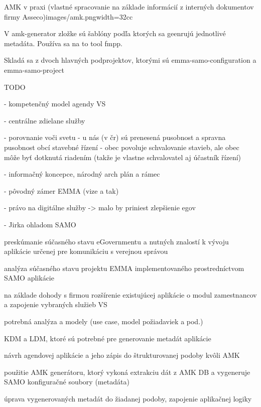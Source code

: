{AMK v praxi (vlastné spracovanie na základe informácií z interných dokumentov firmy Asseco)}{images/amk.png}{width=32cc}

V amk-generator zložke sú šablóny podľa ktorých sa geenrujú jednotlivé metadáta. Používa sa na to tool fmpp.

Skladá sa z dvoch hlavných podprojektov, ktorými sú emma-samo-configuration a emma-samo-project


\TODO
TODO

- kompetenčný model agendy VS

- centrálne zdielane služby

- porovnanie voči svetu - u nás (v čr) sú prenesená pusobnost a spravna pusobnost obcí
stavebné řízení - obec povoluje schvalovanie stavieb, ale obec môže byť dotknutá riadením (takže je vlastne schvalovatel aj účastník řízení)

- informačný koncepce, národný arch plán a rámec

- pôvodný zámer EMMA (vize a tak)

- právo na digitálne služby -> malo by priniest zlepšienie egov

- Jirka ohladom SAMO


\startitemize[n]
\item{preskúmanie súčasného stavu eGovernmentu a nutných znalostí k vývoju aplikácie určenej pre komunikáciu s verejnou správou}
\item{analýza súčasného stavu projektu EMMA implementovaného prostredníctvom SAMO aplikácie}
\item{na základe dohody s firmou rozšírenie existujúcej aplikácie o modul zamestnancov a zapojenie vybraných služieb VS}
\startitemize[a]
\item{potrebná analýza a modely (use case, model požiadaviek a pod.)}
\item{KDM a LDM, ktoré sú potrebné pre generovanie metadát aplikácie}
\item{návrh agendovej aplikácie a jeho zápis do štrukturovanej podoby kvôli AMK}
\item{použitie AMK generátoru, ktorý vykoná extrakciu dát z AMK DB a vygeneruje SAMO konfiguračné soubory (metadáta)}
\item{úprava vygenerovaných metadát do žiadanej podoby, zapojenie aplikačnej logiky}
\stopitemize
\stopitemize

